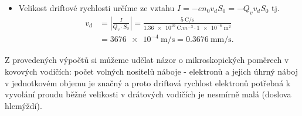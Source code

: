 \begin{mdframed}[style=mdexam]
\begin{example}
\begin{itemize}[leftmargin=2em]
    \item Velikost driftové rychlosti určíme ze vztahu $I = -en_0v_dS_0 = - Q_v v_d S_0$ tj.
    \begin{align*}
      v_d &= \left\lvert\frac{I}{Q_v\cdot S_0}\right\rvert                       
           = \frac{\SI{5}{\coulomb\per\s}}{\SI{1.36e10}{\coulomb.m^{-3}}\cdot\SI{1e-6}{\m^2}}   \\
          &= \SI{3676e-4}{\m\per\s} = \SI{0.3676}{\mm\per\s}.  
    \end{align*}
  \end{itemize}
  Z provedených výpočtů si můžeme udělat názor o mikroskopických poměrech v kovových vodičích: počet
  volných nositelů náboje - elektronů a jejich úhrný náboj v jednotkovém objemu je značný a proto
  driftová rychlost elektronů potřebná k vyvolání proudu běžné velikosti v drátových vodičích je
  nesmírně malá (doslova hlemýždí).
\end{example}  
\end{mdframed}

